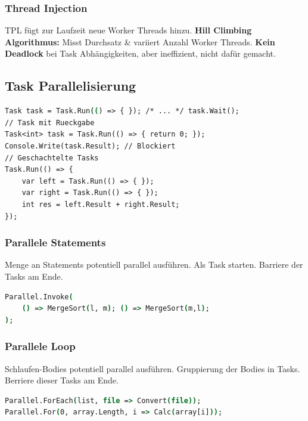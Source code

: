 \subsubsection{Thread Injection}
TPL fügt zur Laufzeit neue Worker Threads hinzu.
\textbf{Hill Climbing Algorithmus:} Misst Durchsatz \& variiert Anzahl Worker Threads.
\textbf{Kein Deadlock} bei Task Abhängigkeiten, aber ineffizient, nicht dafür gemacht.

\subsection{Task Parallelisierung}
\begin{lstlisting}[language=csh]
Task task = Task.Run(() => { }); /* ... */ task.Wait();
// Task mit Rueckgabe 
Task<int> task = Task.Run(() => { return 0; });
Console.Write(task.Result); // Blockiert 
// Geschachtelte Tasks
Task.Run(() => {
    var left = Task.Run(() => { }); 
    var right = Task.Run(() => { });
    int res = left.Result + right.Result;
});
\end{lstlisting}

\subsubsection{Parallele Statements}
Menge an Statements potentiell parallel ausführen. Als Task starten. Barriere der Tasks am Ende.
\begin{lstlisting}[language=csh]
Parallel.Invoke(
    () => MergeSort(l, m); () => MergeSort(m,l);
);
\end{lstlisting}

\subsubsection{Parallele Loop}
Schlaufen-Bodies potentiell parallel ausführen.
Gruppierung der Bodies in Tasks.
Berriere dieser Tasks am Ende.
\begin{lstlisting}[language=csh]
Parallel.ForEach(list, file => Convert(file));
Parallel.For(0, array.Length, i => Calc(array[i]));
\end{lstlisting}

